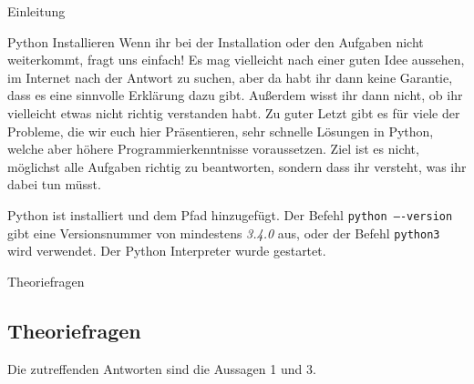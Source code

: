 \begin{task}[points=auto]{Einleitung}
\begin{subtask*}[points=0]{Python Installieren}
        Wenn ihr bei der Installation oder den Aufgaben nicht weiterkommt, fragt uns einfach! Es mag vielleicht nach einer guten Idee aussehen, im Internet nach der Antwort zu suchen, aber da habt ihr dann keine Garantie, dass es eine sinnvolle Erklärung dazu gibt. Außerdem wisst ihr dann nicht, ob ihr vielleicht etwas nicht richtig verstanden habt. Zu guter Letzt gibt es für viele der Probleme, die wir euch hier Präsentieren, sehr schnelle Lösungen in Python, welche aber höhere Programmierkenntnisse voraussetzen. Ziel ist es nicht, möglichst alle Aufgaben richtig zu beantworten, sondern dass ihr versteht, was ihr dabei tun müsst.
        \begin{solution}
            Python ist installiert und dem Pfad hinzugefügt. Der Befehl
            \texttt{python ----version} gibt eine Versionsnummer von mindestens \textit{3.4.0}
            aus, oder der Befehl \texttt{python3} wird verwendet. Der Python Interpreter
            wurde gestartet.
        \end{solution}
    \end{subtask*}
    \begin{subtask*}[points=0]{Theoriefragen}
        \subsection{Theoriefragen}
        \begin{itemize}
            \mchead
        \end{itemize}
        \begin{solution}
            Die zutreffenden Antworten sind die Aussagen 1 und 3.
        \end{solution}
    \end{subtask*}
\end{task}
